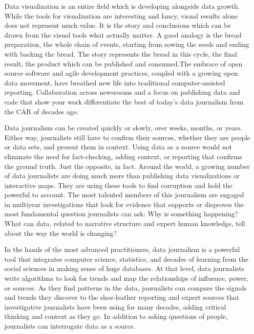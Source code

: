 Data visualization is an entire field which is developing alongside data growth. While the tools for visualization are interesting and fancy, visual results alone does not represent much value. It is the story and conclusions which can be drawn from the visual tools what actually matter. A good analogy is the bread preparation, the whole chain of events, starting from sowing the seeds and ending with backing the bread. The story represents the bread in this cycle, the final result, the product which can be published and consumed.The embrace of open source software and agile development practices, coupled with a growing open data movement, have breathed new life into traditional computer-assisted reporting. Collaboration across newsrooms and a focus on publishing data and code that show your work differentiate the best of today’s data journalism from the CAR of decades ago.

Data journalism can be created quickly or slowly, over weeks, months, or years. Either way, journalists still have to confirm their sources, whether they are people or data sets, and present them in context. Using data as a source would not eliminate the need for fact-checking, adding context, or reporting that confirms the ground truth. Just the opposite, in fact. Around the world, a growing number of data journalists are doing much more than publishing data visualizations or interactive maps. They are using these tools to find corruption and hold the powerful to account. The most talented members of this journalism are engaged in multiyear investigations that look for evidence that supports or disproves the most fundamental question journalists can ask: Why is something happening? What can data, related to narrative structure and expert human knowledge, tell about the way the world is changing?

In the hands of the most advanced practitioners, data journalism is a powerful tool that integrates computer science, statistics, and decades of learning from the social sciences in making sense of huge databases. At that level, data journalists write algorithms to look for trends and map the relationships of influence, power, or sources. As they find patterns in the data, journalists can compare the signals and trends they discover to the shoe-leather reporting and expert sources that investigative journalists have been using for many decades, adding critical thinking and context as they go. In addition to asking questions of people, journalists can interrogate data as a source.


